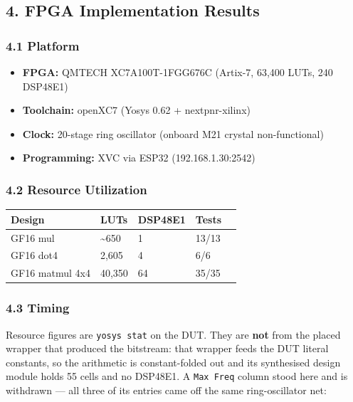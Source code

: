 \documentclass[
]{article}
\newcounter{none} %
\providecommand{\tightlist}{%
  \setlength{\itemsep}{0pt}\setlength{\parskip}{0pt}}
\begin{document}
\subsection{4. FPGA Implementation
Results}\label{fpga-implementation-results}

\subsubsection{4.1 Platform}\label{platform}

\begin{itemize}
\tightlist
\item
  \textbf{FPGA:} QMTECH XC7A100T-1FGG676C (Artix-7, 63,400 LUTs, 240
  DSP48E1)
\item
  \textbf{Toolchain:} openXC7 (Yosys 0.62 + nextpnr-xilinx)
\item
  \textbf{Clock:} 20-stage ring oscillator (onboard M21 crystal
  non-functional)
\item
  \textbf{Programming:} XVC via ESP32 (192.168.1.30:2542)
\end{itemize}

\subsubsection{4.2 Resource Utilization}\label{resource-utilization}

{\def\LTcaptype{none} %
\begin{longtable}[]{@{}lllll@{}}
\toprule\noalign{}
Design & LUTs & DSP48E1 & Tests \\
\midrule\noalign{}
\endhead
\bottomrule\noalign{}
\endlastfoot
GF16 mul & \textasciitilde650 & 1 & 13/13 \\
GF16 dot4 & 2,605 & 4 & 6/6 \\
GF16 matmul 4x4 & 40,350 & 64 & 35/35 \\
\end{longtable}
}

\subsubsection{4.3 Timing}\label{timing}

Resource figures are \texttt{yosys stat} on the DUT. They are \textbf{not} from the placed wrapper that produced the bitstream: that wrapper feeds the DUT literal constants, so the arithmetic is constant-folded out and its synthesised design module holds 55 cells and no DSP48E1. A \texttt{Max Freq} column stood here and is withdrawn --- all three of its entries came off the same ring-oscillator net:
\end{document}
